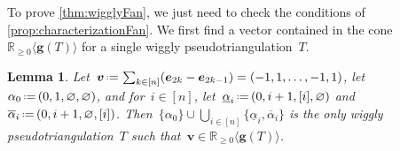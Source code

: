 \documentclass{amsart}
\newtheorem{lemma}[theorem]{Lemma}
\theoremstyle{definition}
\newcommand{\R}{\mathbb{R}} %
\renewcommand{\b}[1]{{\boldsymbol{#1}}} %
\newcommand{\eqdef}{\mbox{\,\raisebox{0.2ex}{\scriptsize\ensuremath{\mathrm:}}\ensuremath{=}\,}} %
\begin{document}
To prove \cref{thm:wigglyFan}, we just need to check the conditions of \cref{prop:characterizationFan}.
We first find a vector contained in the cone~$\R_{\ge 0} \langle \b{g}(T) \rangle$ for a single wiggly pseudotriangulation~$T$.

\begin{lemma}
\label{lem:-+...-+}
Let~$\b{v} \eqdef \sum_{k \in [n]} (\b{e}_{2k} - \b{e}_{2k-1}) = (-1, 1, \dots, -1, 1)$, let~$\alpha_0 \eqdef (0, 1, \varnothing, \varnothing)$, and for~${i \in [n]}$, let~$\underline{\alpha}_i \eqdef (0, i+1, [i], \varnothing)$ and~$\overline{\alpha}_i \eqdef (0, i+1, \varnothing, [i])$.
Then~$\{\alpha_0\} \cup \bigcup_{i \in [n]} \{\underline{\alpha}_i, \overline{\alpha}_i\}$ is the only wiggly pseudotriangulation~$T$ such that~$\b{v} \in \R_{\ge 0} \langle \b{g}(T) \rangle$.
\end{lemma}
\end{document}
